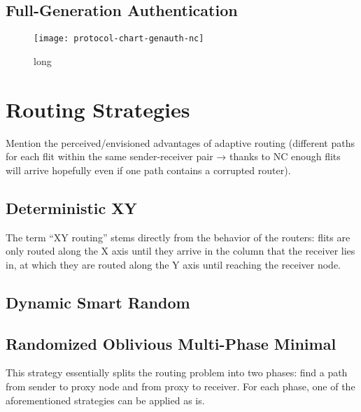 \subsection{Full-Generation Authentication}\label{subsec:genauth}
\begin{figure}
    \centering
    \texttt{[image: protocol-chart-genauth-nc]}
    \caption[short]{long}
    \label{fig:protchartgenauthnc}
\end{figure}

\section{Routing Strategies}
Mention the perceived/envisioned advantages of adaptive routing (different paths for each flit within the same sender-receiver pair → thanks
to NC enough flits will arrive hopefully even if one path contains a corrupted router).

\subsection{Deterministic XY}
The term \enquote{XY routing} stems directly from the behavior of the routers: flits are only routed along the X axis until they arrive in the column
that the receiver lies in, at which they are routed along the Y axis until reaching the receiver node.
\subsection{Dynamic Smart Random}
\subsection{Randomized Oblivious Multi-Phase Minimal}
This strategy essentially splits the routing problem into two phases: find a path from sender to proxy node and from proxy to receiver. For each
phase, one of the aforementioned strategies can be applied as is.

